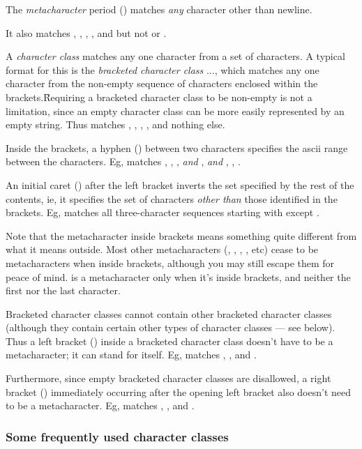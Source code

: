 {The {\em metacharacter} period () matches
{\em any} character other than newline.


\n It also matches , , , ,
and  but not  or .

A {\em character class} matches any one character from
a set of characters.  A typical format for this
is the {\em bracketed character class} \p{[}...\p{]},
which matches any one character from the non-empty sequence
of characters enclosed within the brackets.\f{Requiring
a bracketed character class to be non-empty is not a limitation,
since an
empty character class
can be more easily represented by an empty string.}
Thus  matches , , ,
,  and nothing else.

Inside the brackets, a hyphen (\p{-}) between two
characters specifies the ascii range between the characters.
Eg,  matches , , , {\em and}
, {\em and} , , .

An initial caret (\p{^}) after the left bracket inverts
the set specified by the rest of the contents, ie, it
specifies the set of characters {\em other than} those
identified in the brackets.  Eg,  matches
all three-character sequences starting with 
except .

Note that the metacharacter \p{^} inside brackets means
something quite different from what it means outside.
Most other metacharacters (, \p{*}, \p{+}, ,
etc) cease to be metacharacters when inside brackets,
although you may still escape them for peace of
mind.  \p{-} is a metacharacter only when it's
inside brackets, and neither the first nor the last character.

Bracketed character classes cannot contain other
bracketed character classes (although they contain
certain other types of character classes --- see
below).  Thus a left bracket (\p{[})
inside a bracketed character class doesn't have to be a
metacharacter; it can stand for itself.  Eg,
\q{"[a[b]"} matches , \p{[}, and .

Furthermore, since empty bracketed character classes
are disallowed, a right bracket (\p{]}) immediately occurring
after the opening left bracket
also doesn't need to be a metacharacter.  Eg,
\q{"[]ab]"} matches \p{]}, , and .

\subsubsection{Some frequently used character
classes}

}
